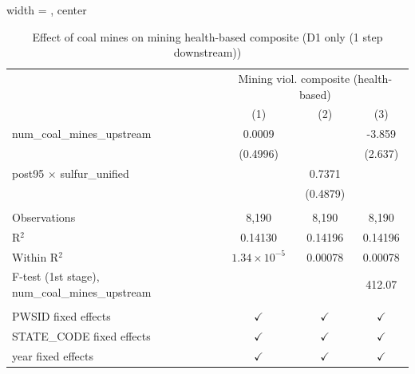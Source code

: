 
\begin{table}[htbp]
   
   \caption{\label{2sls_4step_d1_mining_healthbased} Effect of coal mines on mining health-based composite (D1 only (1 step downstream))}
   \bigskip
   
   \centering
   
   \begin{adjustbox}{width = \textwidth, center}
      
      
      \begin{tabular}{lccc}
         \toprule
         
          & \multicolumn{3}{c}{Mining viol. composite (health-based)}\\
         
                                                           & (1)                   & (2)           & (3)\\  
         
         \midrule 
         num\_coal\_mines\_upstream                        & 0.0009                &               & -3.859\\   
                                                           & (0.4996)              &               & (2.637)\\   
         post95 $\times$ sulfur\_unified                   &                       & 0.7371        &   \\   
                                                           &                       & (0.4879)      &   \\   
         
          \\
         
         Observations                                      & 8,190                 & 8,190         & 8,190\\  
         R$^2$                                             & 0.14130               & 0.14196       & 0.14196\\  
         Within R$^2$                                      & $1.34\times 10^{-5}$  & 0.00078       & 0.00078\\  
         F-test (1st stage), num\_coal\_mines\_upstream    &                       &               & 412.07\\  
         
          \\
         
         PWSID fixed effects                               & $\checkmark$          & $\checkmark$  & $\checkmark$\\   
         STATE\_CODE fixed effects                         & $\checkmark$          & $\checkmark$  & $\checkmark$\\   
         year fixed effects                                & $\checkmark$          & $\checkmark$  & $\checkmark$\\   
         

\end{tabular}
\end{adjustbox}
\end{table}
